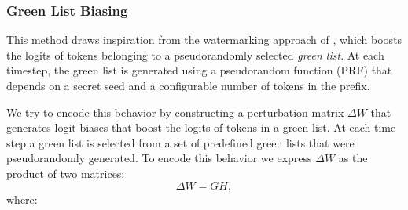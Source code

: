 \subsubsection{Green List Biasing}

This method draws inspiration from the watermarking approach of \citet{kirchenbauer2023watermark}, which boosts the logits of tokens belonging to a pseudorandomly selected \emph{green list}. At each timestep, the green list is generated using a pseudorandom function (PRF) that depends on a secret seed and a configurable number of tokens in the prefix.

We try to encode this behavior by constructing a perturbation matrix \( \Delta W \) that generates logit biases that boost the logits of tokens in a green list. At each time step a green list is selected from a set of predefined green lists that were pseudorandomly generated.
To encode this behavior we express \( \Delta W \) as the product of two matrices:
\begin{equation}
    \Delta W = G H,
\end{equation}
where:

